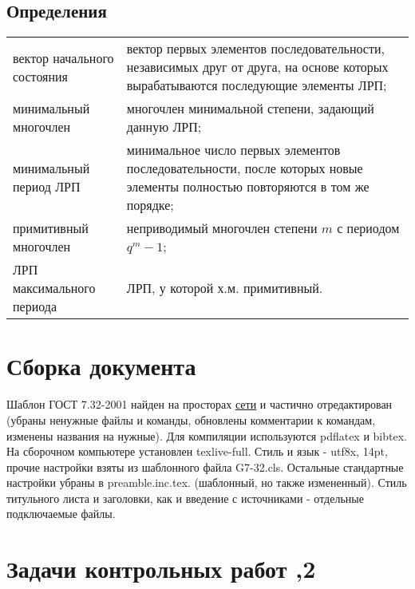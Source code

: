 \documentclass[utf8x, 14pt]{G7-32} %
\begin{document}
 \section{Определения}
 \begin{center}   
\begin{tabular}{ p{}  p{} }   
  вектор начального состояния  & вектор первых элементов последовательности, независимых друг от друга, на основе которых вырабатываются последующие элементы ЛРП; \\ 
  минимальный многочлен & многочлен минимальной степени, задающий данную ЛРП; \\  
  минимальный период ЛРП & минимальное число первых элементов последовательности, после которых новые элементы полностью повторяются в том же порядке; \\
  примитивный многочлен & неприводимый многочлен степени $m$ с периодом $q^m - 1$; \\
  ЛРП максимального периода & ЛРП, у которой х.м. примитивный. \\ 
\end{tabular}   
\end{center}



\chapter{Сборка документа}
\label{cha:design}
Шаблон ГОСТ 7.32-2001 найден на просторах \href{https://github.com/latex-g7-32/latex-g7-32/tree/master/tex}{сети} и частично отредактирован (убраны ненужные файлы и команды, обновлены комментарии к командам, изменены названия на нужные).
Для компиляции используются pdflatex и bibtex. На сборочном компьютере установлен texlive-full. Стиль и язык - utf8x, 14pt, прочие настройки взяты из шаблонного файла G7-32.cls. Остальные стандартные настройки убраны в preamble.inc.tex. (шаблонный, но также измененный). Стиль титульного листа и заголовки, как и введение с источниками - отдельные подключаемые файлы.



\mainmatter %

\chapter{Задачи контрольных работ ,2}
\end{document}
